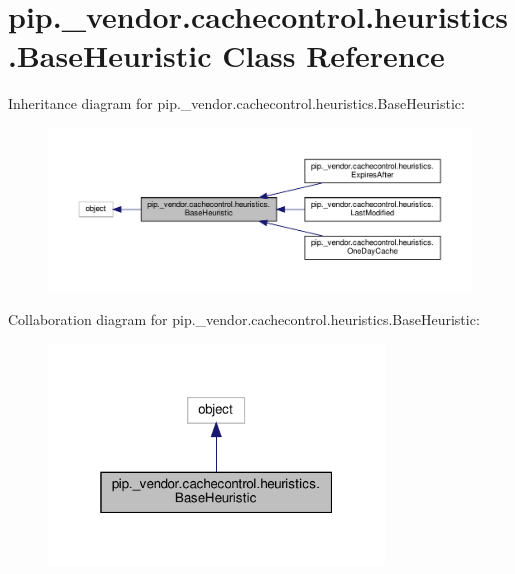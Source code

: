 \hypertarget{classpip_1_1__vendor_1_1cachecontrol_1_1heuristics_1_1BaseHeuristic}{}\section{pip.\+\_\+vendor.\+cachecontrol.\+heuristics.\+Base\+Heuristic Class Reference}
\label{classpip_1_1__vendor_1_1cachecontrol_1_1heuristics_1_1BaseHeuristic}


Inheritance diagram for pip.\+\_\+vendor.\+cachecontrol.\+heuristics.\+Base\+Heuristic\+:
\nopagebreak
\begin{figure}[H]
\begin{center}
\leavevmode
\includegraphics[width=350pt]{classpip_1_1__vendor_1_1cachecontrol_1_1heuristics_1_1BaseHeuristic__inherit__graph}
\end{center}
\end{figure}


Collaboration diagram for pip.\+\_\+vendor.\+cachecontrol.\+heuristics.\+Base\+Heuristic\+:
\nopagebreak
\begin{figure}[H]
\begin{center}
\leavevmode
\includegraphics[width=253pt]{classpip_1_1__vendor_1_1cachecontrol_1_1heuristics_1_1BaseHeuristic__coll__graph}
\end{center}
\end{figure}
